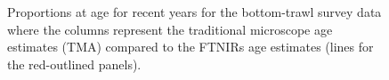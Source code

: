 \documentclass[
  letterpaper,
  DIV=11,
  numbers=noendperiod]{scrreprt}
\begin{document}
\begin{figure}


\caption{\label{fig-proportionsBTS}Proportions at age for recent years
for the bottom-trawl survey data where the columns represent the
traditional microscope age estimates (TMA) compared to the FTNIRs age
estimates (lines for the red-outlined panels).}

\end{figure}%
\end{document}
